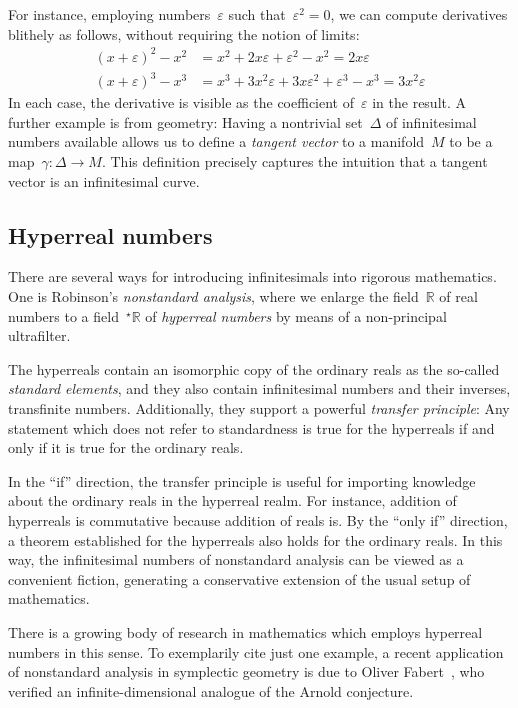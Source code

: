 \documentclass[oneside,reqno]{amsart}
\theoremstyle{definition}
\theoremstyle{plain}
\theoremstyle{remark}
\newcommand{\RR}{\mathbb{R}}
\renewcommand{\_}{\mathpunct{.}\,}
\newcommand{\?}{\,{:}\,}
\begin{document}
For instance, employing numbers~$\varepsilon$ such that~$\varepsilon^2 = 0$, we can
compute derivatives blithely as follows, without requiring the notion of
limits:
\begin{equation}\label{eq:derivative}\tag{$\star$}
  \begin{aligned}
    (x + \varepsilon)^2 - x^2 &= x^2 + 2x\varepsilon + \varepsilon^2 - x^2 = 2x\varepsilon \\
    (x + \varepsilon)^3 - x^3 &= x^3 + 3x^2\varepsilon + 3x\varepsilon^2 + \varepsilon^3 - x^3 = 3x^2\varepsilon
  \end{aligned}
\end{equation}
In each case, the derivative is visible as the coefficient of~$\varepsilon$ in
the result. A further example is from geometry: Having a nontrivial
set~$\Delta$ of infinitesimal numbers available allows us to define a
\emph{tangent vector} to a manifold~$M$ to be a map~$\gamma : \Delta \to M$. This
definition precisely captures the intuition that a tangent vector is an
infinitesimal curve.


\subsection{Hyperreal numbers} There are several ways for introducing
infinitesimals into rigorous mathematics. One is Robinson's \emph{nonstandard
analysis}, where we enlarge the field~$\RR$ of real numbers to a
field~$^\star\RR$ of \emph{hyperreal numbers} by means of a non-principal
ultrafilter.

The hyperreals contain an isomorphic copy of the ordinary reals as the
so-called \emph{standard elements}, and they also contain infinitesimal numbers
and their inverses, transfinite numbers. Additionally, they support a powerful \emph{transfer
principle}: Any statement which does not refer to standardness is true for the
hyperreals if and only if it is true for the ordinary reals.

In the ``if'' direction, the transfer principle is useful for importing
knowledge about the ordinary reals in the hyperreal realm. For instance,
addition of hyperreals is commutative because addition of reals is.
By the ``only if'' direction, a theorem established for the hyperreals also
holds for the ordinary reals. In this way, the infinitesimal numbers of
nonstandard analysis can be viewed as a convenient fiction, generating a
conservative extension of the usual setup of mathematics.

There is a growing body of research in mathematics which employs hyperreal
numbers in this sense. To exemplarily cite just one example, a recent
application of nonstandard analysis in symplectic geometry is due to Oliver
Fabert~\cite{fabert:non-squeezing,fabert:floer}, who verified an
infinite-dimensional analogue of the Arnold conjecture.
\end{document}
